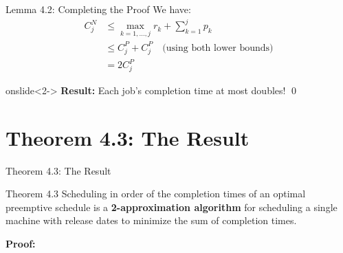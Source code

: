 \documentclass[aspectratio=169, 12pt]{beamer}
\begin{document}
\begin{frame}{Lemma 4.2: Completing the Proof}
    We have:
    \begin{align*}
        C_j^N &\leq \max_{k=1,\ldots,j} r_k + \sum_{k=1}^{j} p_k \\
        &\leq C_j^P + C_j^P \quad \text{(using both lower bounds)} \\
        &= 2C_j^P
    \end{align*}

    \vspace{0.5cm}
    \begin{center}
    \end{center}
    onslide<2->{
        \textbf{Result:} Each job's completion time at most doubles! \qed
    }
\end{frame}

\section{Theorem 4.3: The Result}

\begin{frame}{Theorem 4.3: The Result}
    \begin{block}{Theorem 4.3}
        Scheduling in order of the completion times of an optimal preemptive schedule is a \textbf{2-approximation algorithm} for scheduling a single machine with release dates to minimize the sum of completion times.
    \end{block}

    \vspace{0.5cm}
    \textbf{Proof:}

    \vspace{0.3cm}
\end{frame}
\end{document}
